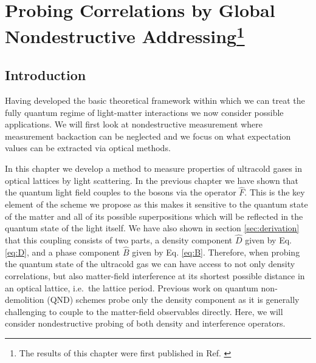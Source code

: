 
\chapter[Probing Correlations by Global 
  Nondestructive Addressing] {Probing Correlations by Global
  Nondestructive Addressing\footnote{The results of this chapter were
    first published in Ref. \cite{kozlowski2015}}}
\label{chap:qnd}

\ifpdf
    \graphicspath{{Chapter3/Figs/Raster/}{Chapter3/Figs/PDF/}{Chapter3/Figs/}}
\else
    \graphicspath{{Chapter3/Figs/Vector/}{Chapter3/Figs/}}
\fi



\section{Introduction}

Having developed the basic theoretical framework within which we can
treat the fully quantum regime of light-matter interactions we now
consider possible applications. We will first look at nondestructive
measurement where measurement backaction can be neglected and we focus
on what expectation values can be extracted via optical methods.

In this chapter we develop a method to measure properties of ultracold
gases in optical lattices by light scattering. In the previous chapter
we have shown that the quantum light field couples to the bosons via
the operator $\hat{F}$. This is the key element of the scheme we
propose as this makes it sensitive to the quantum state of the matter
and all of its possible superpositions which will be reflected in the
quantum state of the light itself. We have also shown in section
\ref{sec:derivation} that this coupling consists of two parts, a
density component $\hat{D}$ given by Eq. \eqref{eq:D}, and a phase
component $\hat{B}$ given by Eq. \eqref{eq:B}. Therefore, when probing
the quantum state of the ultracold gas we can have access to not only
density correlations, but also matter-field interference at its
shortest possible distance in an optical lattice, i.e.~the lattice
period. Previous work on quantum non-demolition (QND) schemes
\cite{mekhov2007prl, rogers2014, eckert2008} probe only the density
component as it is generally challenging to couple to the matter-field
observables directly. Here, we will consider nondestructive probing of
both density and interference operators.

